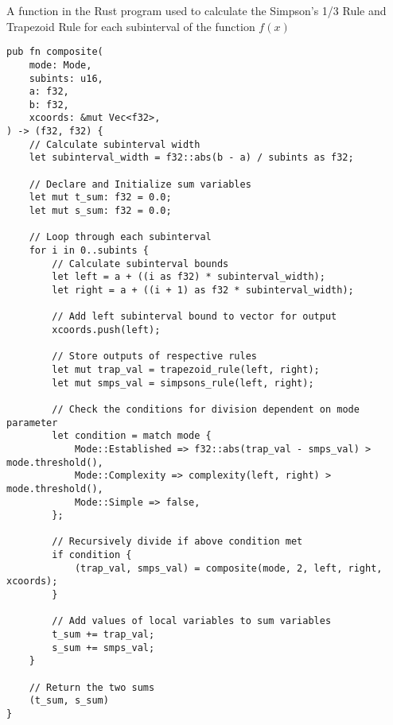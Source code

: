 \documentclass[../IA.tex]{subfiles}
\begin{document}
\begin{listing}[H]
\centering
{}
\caption{A function in the Rust program used to calculate the Simpson's 1/3 Rule and Trapezoid Rule for each subinterval of the function \(f(x)\)}
\label{lst:rust_composite_complexity}
\begin{verbatim}
pub fn composite(
    mode: Mode,
    subints: u16,
    a: f32,
    b: f32,
    xcoords: &mut Vec<f32>,
) -> (f32, f32) {
    // Calculate subinterval width
    let subinterval_width = f32::abs(b - a) / subints as f32;

    // Declare and Initialize sum variables
    let mut t_sum: f32 = 0.0;
    let mut s_sum: f32 = 0.0;

    // Loop through each subinterval
    for i in 0..subints {
        // Calculate subinterval bounds
        let left = a + ((i as f32) * subinterval_width);
        let right = a + ((i + 1) as f32 * subinterval_width);

        // Add left subinterval bound to vector for output
        xcoords.push(left);

        // Store outputs of respective rules
        let mut trap_val = trapezoid_rule(left, right);
        let mut smps_val = simpsons_rule(left, right);

        // Check the conditions for division dependent on mode parameter
        let condition = match mode {
            Mode::Established => f32::abs(trap_val - smps_val) > mode.threshold(),
            Mode::Complexity => complexity(left, right) > mode.threshold(),
            Mode::Simple => false,
        };

        // Recursively divide if above condition met
        if condition {
            (trap_val, smps_val) = composite(mode, 2, left, right, xcoords);
        }

        // Add values of local variables to sum variables
        t_sum += trap_val;
        s_sum += smps_val;
    }

    // Return the two sums
    (t_sum, s_sum)
}
\end{verbatim}
\end{listing}
\end{document}

